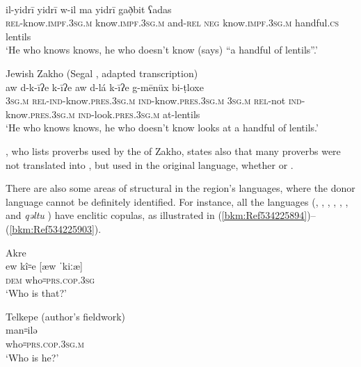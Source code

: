 \documentclass[output=paper]{langsci/langscibook}
\begin{document}
\ea\label{bkm:Ref534225045}  \citep[235]{Chyet1995} \\
\gll il-yidrī   yidrī     w-il ma yidrī     gað̣bit ʕadas\\
    \textsc{rel}\textup{{}-know.}\textsc{impf.3sg.m} \textup{know.}\textsc{impf.3sg.m} \textup{and-}\textsc{rel} \textsc{neg} \textup{know.}\textsc{impf.3sg.m} handful\textsc{.cs} lentils\\
\glt ‘He who knows knows, he who doesn’t know (says) “a handful of lentils”.’\z

\ea\label{bkm:Ref534225057}Jewish Zakho  (Segal \citeyear[262]{Segal1955}, adapted transcription)\\
\gll aw d-k-īʔe   k-īʔe     aw d-lá k-īʔe   g-mēnüx bi-ṭloxe\\
    \textsc{3sg.m} \textsc{rel}\textup{{}-}\textsc{ind-}\textup{know}\textsc{.pres.3sg.m} \textsc{ind}\textup{{}-know.}\textsc{pres.3sg.m} \textsc{3sg.m} \textsc{rel}\textup{{}-not} \textsc{ind}\textup{{}-know.}\textsc{pres.3sg.m} \textsc{ind-}\textup{look.}\textsc{pres}.\textsc{3sg.m} \textup{at-lentils}\\
\glt ‘He who knows knows, he who doesn’t know looks at a handful of lentils.’\z

\citet{Sabar1978}, who lists proverbs used by the  of Zakho, states also that many proverbs were not translated into , but used in the original language, whether  or .

There are also some areas of structural  in the region’s languages, where the donor language cannot be definitely identified. For instance, all the languages (, ,  , , , ,   and \textit{qəltu} ) have enclitic copulas, as illustrated in (\ref{bkm:Ref534225894})–(\ref{bkm:Ref534225903}).

\ea\label{bkm:Ref534225894}Akre  \citep[175]{MacKenzie1961}\\
\gll ew kî꞊e \textup{[æw ˈkiːæ]}\\
     \textsc{dem} who꞊\textsc{prs.cop.3sg}\\
\glt ‘Who is that?’ 
\z

\ea {} Telkepe  (author’s fieldwork)\\
\gll man꞊ilə\\
     who꞊\textsc{prs.cop.3sg.m}\\
\glt ‘Who is he?’\z
\end{document}

